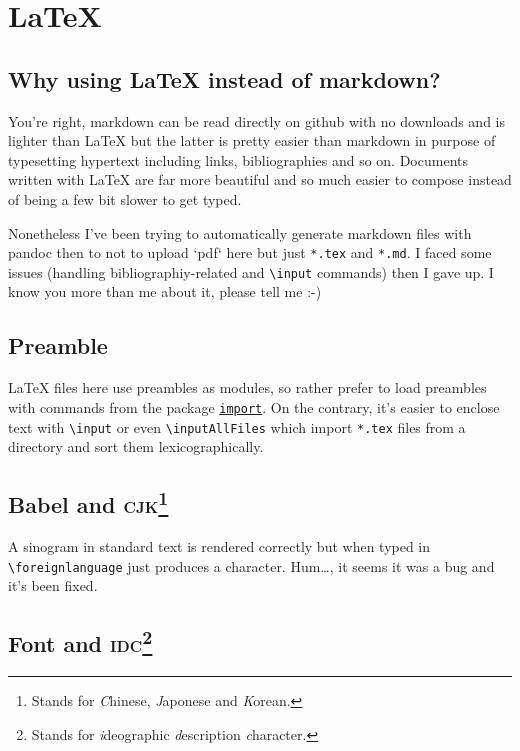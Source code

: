 \section{\LaTeX{}}

\subsection{Why using \LaTeX{} instead of markdown?}

You're right, markdown can be read directly on github with no downloads and is lighter than \LaTeX{} but the latter is pretty easier than markdown in purpose of typesetting hypertext including links, bibliographies and so on. Documents written with \LaTeX{} are far more beautiful and so much easier to compose instead of being a few bit slower to get typed.

Nonetheless I've been trying to automatically generate markdown files with pandoc then to not to upload `pdf` here but just \texttt{*.tex} and \texttt{*.md}. I faced some issues (handling bibliographiy-related and \texttt{\textbackslash{}input} commands) then I gave up. I know you more than me about it, please tell me :-)

\subsection{Preamble}

\LaTeX{} files here use preambles as modules, so rather prefer to load preambles with commands from the package \href{http://ctan.mines-albi.fr/macros/latex/contrib/import/import.pdf}{\texttt{import}}. On the contrary, it's easier to enclose text with \texttt{\textbackslash{}input} or even \texttt{\textbackslash{}inputAllFiles} which import \texttt{*.tex} files from a directory and sort them lexicographically.

\subsection{Babel and \textsc{cjk}\footnote{Stands for \textsl{C}hinese, \textsl{J}aponese and \textsl{K}orean.}}

A sinogram in standard text is rendered correctly but when typed in \texttt{\textbackslash{}foreignlanguage} just produces a  character. Hum\dots{}, it seems it was a bug and it's been fixed.

\subsection{Font and \textsc{idc}\footnote{Stands for \textsl{i}deographic \textsl{d}escription \textsl{c}haracter.}}

